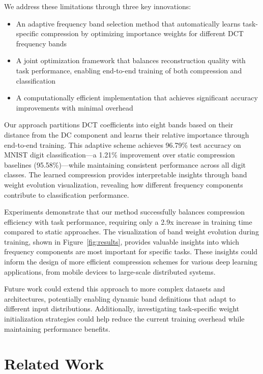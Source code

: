 \documentclass{article} %
\begin{document}
We address these limitations through three key innovations:

\begin{itemize}
    \item An adaptive frequency band selection method that automatically learns task-specific compression by optimizing importance weights for different DCT frequency bands
    \item A joint optimization framework that balances reconstruction quality with task performance, enabling end-to-end training of both compression and classification
    \item A computationally efficient implementation that achieves significant accuracy improvements with minimal overhead
\end{itemize}

Our approach partitions DCT coefficients into eight bands based on their distance from the DC component and learns their relative importance through end-to-end training. This adaptive scheme achieves 96.79\% test accuracy on MNIST digit classification---a 1.21\% improvement over static compression baselines (95.58\%)---while maintaining consistent performance across all digit classes. The learned compression provides interpretable insights through band weight evolution visualization, revealing how different frequency components contribute to classification performance.

Experiments demonstrate that our method successfully balances compression efficiency with task performance, requiring only a 2.9x increase in training time compared to static approaches. The visualization of band weight evolution during training, shown in Figure~\ref{fig:results}, provides valuable insights into which frequency components are most important for specific tasks. These insights could inform the design of more efficient compression schemes for various deep learning applications, from mobile devices to large-scale distributed systems.

Future work could extend this approach to more complex datasets and architectures, potentially enabling dynamic band definitions that adapt to different input distributions. Additionally, investigating task-specific weight initialization strategies could help reduce the current training overhead while maintaining performance benefits.

\section{Related Work}
\label{sec:related}
\end{document}
